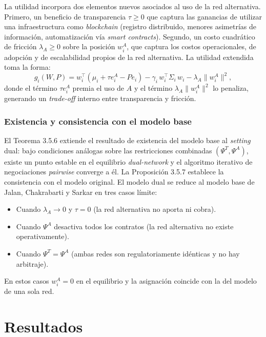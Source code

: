 \documentclass[12pt,a4paper]{article}
\begin{document}
La utilidad incorpora dos elementos nuevos asociados al uso de la red alternativa. Primero, un
beneficio de transparencia $\tau \geq 0$ que captura las ganancias de utilizar una
infraestructura como \textit{blockchain} (registro distribuido, menores asimetrías de
información, automatización vía \textit{smart contracts}). Segundo, un costo cuadrático de
fricción $\lambda_A \geq 0$ sobre la posición $w^A_i$, que captura los costos operacionales, de
adopción y de escalabilidad propios de la red alternativa. La utilidad extendida toma la forma:
\begin{equation}
    g_i(W, P) = w_i^\top (\mu_i + \tau e^A_i - P e_i) - \gamma_i\, w_i^\top \Sigma_i\, w_i
    - \lambda_A \|w^A_i\|^2,
\end{equation}
donde el término $\tau e^A_i$ premia el uso de $A$ y el término $\lambda_A \|w^A_i\|^2$ lo
penaliza, generando un \textit{trade-off} interno entre transparencia y fricción.

\subsubsection*{Existencia y consistencia con el modelo base}

El Teorema 3.5.6 extiende el resultado de existencia del modelo base al \textit{setting} dual:
bajo condiciones análogas sobre las restricciones combinadas $(\Psi^T, \Psi^A)$, existe un
punto estable en el equilibrio \textit{dual-network} y el algoritmo iterativo de negociaciones
\textit{pairwise} converge a él. La Proposición 3.5.7 establece la consistencia con el modelo
original. El modelo dual se reduce al modelo base de Jalan, Chakrabarti y Sarkar en tres casos límite:
\begin{itemize}
    \item Cuando $\lambda_A \to 0$ y $\tau = 0$ (la red alternativa no aporta ni cobra).
    \item Cuando $\Psi^A$ desactiva todos los contratos (la red alternativa no existe
    operativamente).
    \item Cuando $\Psi^T = \Psi^A$ (ambas redes son regulatoriamente idénticas y no hay
    arbitraje).
\end{itemize}
En estos casos $w^A_i = 0$ en el equilibrio y la asignación coincide con la del modelo de una
sola red.


\section*{Resultados}
\end{document}
